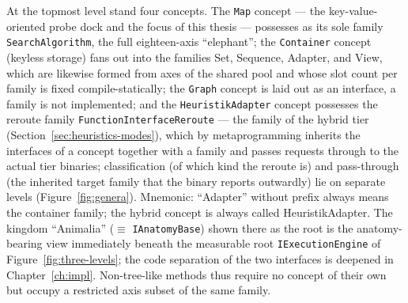 \begin{nurlang}
At the topmost level stand four concepts. The \texttt{Map} concept --- the
key-value-oriented probe dock and the focus of this thesis --- possesses as its sole family
\texttt{SearchAlgorithm}, the full eighteen-axis \enquote{elephant}; the \texttt{Container} concept
(keyless storage) fans out into the families Set, Sequence, Adapter, and View, which are likewise formed from
axes of the shared pool and whose slot count per family is fixed
compile-statically; the \texttt{Graph} concept is laid out as an interface, a family is not implemented; and
the \texttt{HeuristikAdapter} concept possesses the reroute family \texttt{FunctionInterfaceReroute} --- the
family of the hybrid tier (Section~\ref{sec:heuristics-modes}), which by metaprogramming inherits the
interfaces of a concept together with a family and passes requests through to the actual tier binaries;
classification (of which kind the reroute is) and pass-through (the inherited target family that the binary
reports outwardly) lie on separate levels (Figure~\ref{fig:genera}). Mnemonic:
\enquote{Adapter} without prefix always means the container family; the hybrid concept is always called
HeuristikAdapter. The kingdom \enquote{Animalia} ($\equiv$ \texttt{IAnatomyBase}) shown there as the root
is the anatomy-bearing view immediately beneath the measurable root \texttt{IExecutionEngine} of
Figure~\ref{fig:three-levels}; the code separation of the two interfaces is deepened in Chapter~\ref{ch:impl}.
Non-tree-like methods thus require no concept of their own but occupy a restricted
axis subset of the same family.
\begin{figure}[htbp]\centering
\end{figure}
\end{nurlang}
